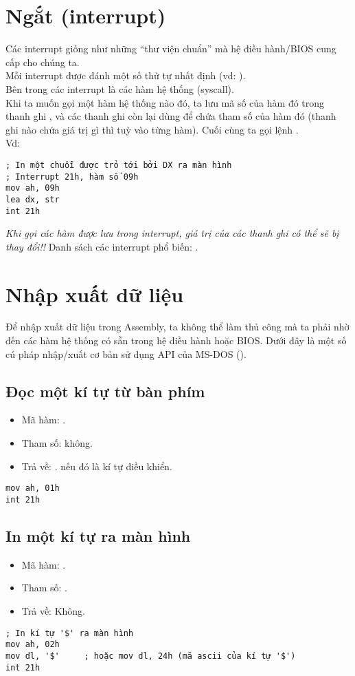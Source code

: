 \documentclass[main.tex]{subfiles}
\begin{document}
\section{Ngắt (interrupt)}
Các interrupt giống như những ``thư viện chuẩn'' mà hệ điều hành/BIOS cung cấp cho chúng ta. \\
Mỗi interrupt được đánh một số thứ tự nhất định (vd: ).\\
Bên trong các interrupt là các hàm hệ thống (syscall).\\
Khi ta muốn gọi một hàm hệ thống nào đó, ta lưu mã số của hàm đó trong thanh ghi , và các thanh ghi còn lại dùng để chứa tham số của hàm đó (thanh ghi nào chứa giá trị gì thì tuỳ vào từng hàm). Cuối cùng ta gọi lệnh .\\
Vd:
\begin{verbatim}
; In một chuỗi được trỏ tới bởi DX ra màn hình 
; Interrupt 21h, hàm số 09h
mov ah, 09h 
lea dx, str 
int 21h
\end{verbatim} 
\textit{Khi gọi các hàm được lưu trong interrupt, giá trị của các thanh ghi có thể sẽ bị thay đổi!!}
Danh sách các interrupt phổ biến: \href{https://jbwyatt.com/253/emu/8086_bios_and_dos_interrupts.html}{}.

\section{Nhập xuất dữ liệu}
Để nhập xuất dữ liệu trong Assembly, ta không thể làm thủ công mà ta phải nhờ đến các hàm hệ thống có sẵn trong hệ điều hành hoặc BIOS. Dưới đây là một số cú pháp nhập/xuất cơ bản sử dụng API của MS-DOS ().

\subsection{Đọc một kí tự từ bàn phím}
\begin{itemize}
    \item Mã hàm: .
    \item Tham số: không.
    \item Trả về: .  nếu đó là kí tự điều khiển.
\end{itemize}
\begin{verbatim}
mov ah, 01h 
int 21h
\end{verbatim}

\subsection{In một kí tự ra màn hình}
\begin{itemize}
    \item Mã hàm: .
    \item Tham số: .
    \item Trả về: Không.
\end{itemize}
\begin{verbatim}
; In kí tự '$' ra màn hình 
mov ah, 02h 
mov dl, '$'     ; hoặc mov dl, 24h (mã ascii của kí tự '$')
int 21h
\end{verbatim}
\end{document}
